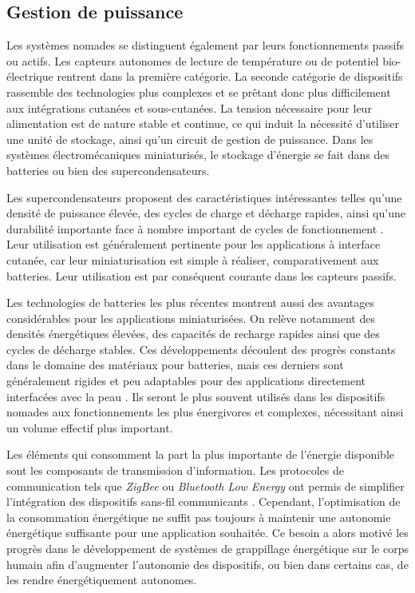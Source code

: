 	\subsection{Gestion de puissance}
	\label{subsec:1.3.2_gestion de puissance}
Les systèmes nomades se distinguent également par leurs fonctionnements passifs ou actifs. Les capteurs autonomes de lecture de température ou de potentiel bio-électrique rentrent dans la première catégorie. La seconde catégorie de dispositifs rassemble des technologies plus complexes et se prêtant donc plus difficilement aux intégrations cutanées et sous-cutanées. La tension nécessaire pour leur alimentation est de nature stable et continue, ce qui induit la nécessité d'utiliser une unité de stockage, ainsi qu'un circuit de gestion de puissance. Dans les systèmes électromécaniques miniaturisés, le stockage d'énergie se fait dans des batteries ou bien des supercondensateurs.

Les supercondensateurs proposent des caractéristiques intéressantes telles qu'une densité de puissance élevée, des cycles de charge et décharge rapides, ainsi qu'une durabilité importante face à nombre important de cycles de fonctionnement \cite{Gonzalez2016}. Leur utilisation est généralement pertinente pour les applications à interface cutanée, car leur miniaturisation est simple à réaliser, comparativement aux batteries. Leur utilisation est par conséquent courante dans les capteurs passifs.

Les technologies de batteries les plus récentes montrent aussi des avantages considérables pour les applications miniaturisées. On relève notamment des densités énergétiques élevées, des capacités de recharge rapides ainsi que des cycles de décharge stables. Ces développements découlent des progrès constants dans le domaine des matériaux pour batteries, mais ces derniers sont généralement rigides et peu adaptables pour des applications directement interfacées avec la peau \cite{Wang2015}. Ils seront le plus souvent utilisés dans les dispositifs nomades aux fonctionnements les plus énergivores et complexes, nécessitant ainsi un volume effectif plus important.

Les éléments qui consomment la part la plus importante de l'énergie disponible sont les composants de transmission d'information. Les protocoles de communication tels que \emph{ZigBee} ou \emph{Bluetooth Low Energy} ont permis de simplifier l’intégration des dispositifs sans-fil communicants \cite{Gibus2020}. Cependant, l'optimisation de la consommation énergétique ne suffit pas toujours à maintenir une autonomie énergétique suffisante pour une application souhaitée. Ce besoin a alors motivé les progrès dans le développement de systèmes de grappillage énergétique sur le corps humain afin d'augmenter l'autonomie des dispositifs, ou bien dans certains cas, de les rendre énergétiquement autonomes.
